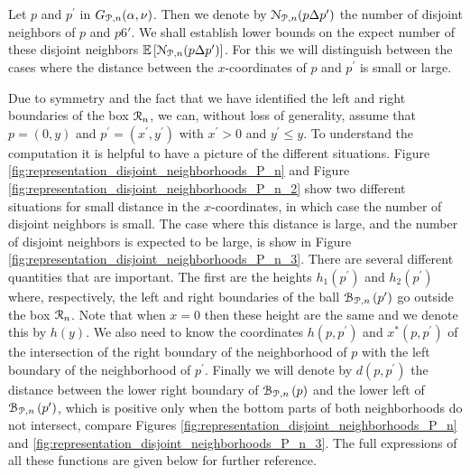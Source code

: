 \begin{appendices}
Let $p$ and $p^\prime$ in $G_{{\mathcal P},n}(\alpha,\nu)$. Then we denote by ${\mathcal N}_{{\mathcal P},n}(p\Delta p^\prime)$ the number of disjoint neighbors of $p$ and $p6\prime$. We shall establish lower bounds on the expect number of these disjoint neighbors $\mathbb{E}\left[{\mathcal N}_{{\mathcal P},n}(p\Delta p^\prime)\right]$. For this we will distinguish between the cases where the distance between the $x$-coordinates of $p$ and $p^\prime$ is small or large. 

Due to symmetry and the fact that we have identified the left and right boundaries of the box ${\mathcal R}_n$, we can, without loss of generality, assume that $p = (0,y)$ and $p^\prime = (x^\prime,y^\prime)$ with $x^\prime > 0$ and $y^\prime \le y$. To understand the computation it is helpful to have a picture of the different situations. Figure \ref{fig:representation_disjoint_neighborhoods_P_n} and Figure \ref{fig:representation_disjoint_neighborhoods_P_n_2} show two different situations for small distance in the $x$-coordinates, in which case the number of disjoint neighbors is small. The case where this distance is large, and the number of disjoint neighbors is expected to be large, is show in Figure \ref{fig:representation_disjoint_neighborhoods_P_n_3}. There are several different quantities that are important. The first are the heights $h_1(p^\prime)$ and $h_2(p^\prime)$ where, respectively, the left and right boundaries of the ball ${\mathcal B}_{{\mathcal P},n}\left(p^\prime\right)$ go outside the box ${\mathcal R}_n$. Note that when $x = 0$ then these height are the same and we denote this by $h(y)$. We also need to know the coordinates $h(p,p^\prime)$ and $x^\ast(p,p^\prime)$ of the intersection of the right boundary of the neighborhood of $p$ with the left boundary of the neighborhood of $p^\prime$. Finally we will denote by $d(p,p^\prime)$ the distance between the lower right boundary of ${\mathcal B}_{{\mathcal P},n}\left(p\right)$ and the lower left of ${\mathcal B}_{{\mathcal P},n}\left(p^\prime\right)$, which is positive only when the bottom parts of both neighborhoods do not intersect, compare Figures \ref{fig:representation_disjoint_neighborhoods_P_n} and \ref{fig:representation_disjoint_neighborhoods_P_n_3}. The full expressions of all these functions are given below for further reference.


\end{appendices}
